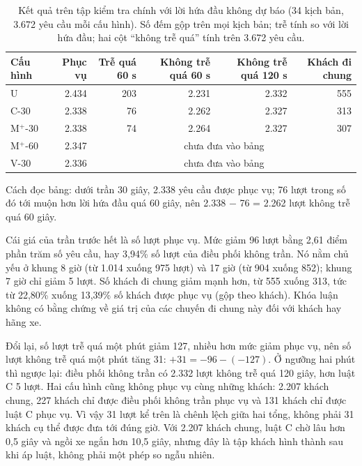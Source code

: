 \begin{table}[htbp]
\centering
\caption{Kết quả trên tập kiểm tra chính với lời hứa đầu không dự báo (34 kịch bản, 3.672 yêu cầu mỗi
cấu hình). Số đếm gộp trên mọi kịch bản; trễ tính so với lời hứa đầu; hai cột ``không trễ quá'' tính trên
3.672 yêu cầu.}
\label{bang:c4-chinh}
\small
\begin{tabular}{@{}lrrrrr@{}}
\toprule
\textbf{Cấu hình} & \textbf{Phục vụ} & \textbf{Trễ quá 60 s} & \textbf{Không trễ quá 60 s} &
\textbf{Không trễ quá 120 s} & \textbf{Khách đi chung}\\
\midrule
U & 2.434 & 203 & 2.231 & 2.332 & 555\\
C-30 & 2.338 & 76 & 2.262 & 2.327 & 313\\
M$^{+}$-30 & 2.338 & 74 & 2.264 & 2.327 & 307\\
M$^{+}$-60 & 2.347 & \multicolumn{4}{c}{chưa đưa vào bảng}\\
V-30 & 2.336 & \multicolumn{4}{c}{chưa đưa vào bảng}\\
\bottomrule
\end{tabular}
\end{table}

Cách đọc bảng: dưới trần 30 giây, 2.338 yêu cầu được phục vụ; 76 lượt trong số đó tới muộn hơn lời hứa
đầu quá 60 giây, nên 2.338 $-$ 76 = 2.262 lượt không trễ quá 60 giây.

Cái giá của trần trước hết là số lượt phục vụ. Mức giảm 96 lượt bằng 2,61 điểm phần trăm số yêu cầu,
hay 3,94\% số lượt của điều phối không trần. Nó nằm chủ yếu ở khung 8 giờ (từ 1.014 xuống 975 lượt) và
17 giờ (từ 904 xuống 852); khung 7 giờ chỉ giảm 5 lượt. Số khách đi chung giảm mạnh hơn, từ 555 xuống
313, tức từ 22,80\% xuống 13,39\% số khách được phục vụ (gộp theo khách). Khóa luận không có bằng chứng
về giá trị của các chuyến đi chung này đối với khách hay hãng xe.

Đổi lại, số lượt trễ quá một phút giảm 127, nhiều hơn mức giảm phục vụ, nên số lượt không trễ quá một
phút tăng 31: $+31 = -96 - (-127)$. Ở ngưỡng hai phút thì ngược lại: điều phối không trần có 2.332 lượt
không trễ quá 120 giây, hơn luật C 5 lượt. Hai cấu hình cũng không phục vụ cùng những khách: 2.207 khách
chung, 227 khách chỉ được điều phối không trần phục vụ và 131 khách chỉ được luật C phục vụ. Vì vậy 31
lượt kể trên là chênh lệch giữa hai tổng, không phải 31 khách cụ thể được đưa tới đúng giờ. Với 2.207
khách chung, luật C chờ lâu hơn 0,5 giây và ngồi xe ngắn hơn 10,5 giây, nhưng đây là tập khách hình thành
sau khi áp luật, không phải một phép so ngẫu nhiên.

